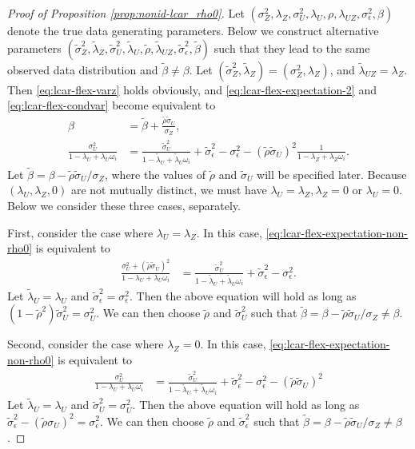 \documentclass[11pt]{article}
\theoremstyle{definition}
\theoremstyle{remark}
\begin{document}
\begin{proof}[Proof of Proposition \ref{prop:nonid-lcar_rho0}]
    Let $(\sigma_Z^2, \lambda_Z, \sigma_U^2, \lambda_U, \rho, \lambda_{UZ}, \sigma_\epsilon^2, \beta)$ denote the true data generating parameters. 
Below we construct alternative parameters $(\tilde\sigma_Z^2, \tilde\lambda_Z, \tilde\sigma_U^2, \tilde\lambda_U, \tilde\rho, \tilde\lambda_{UZ}, \tilde\sigma_\epsilon^2, \tilde\beta)$ such that they lead to the same observed data distribution and $\tilde\beta \ne \beta$. 
Let $(\tilde\sigma_Z^2, \tilde{\lambda}_Z) = (\sigma_Z^2, \lambda_Z)$, and $\tilde\lambda_{UZ} = \lambda_Z$. 
Then \eqref{eq:lcar-flex-varz} holds obviously, 
and \eqref{eq:lcar-flex-expectation-2} and \eqref{eq:lcar-flex-condvar} become equivalent to 
\begin{align}\label{eq:lcar-flex-expectation-non-rho0}
\beta & = \tilde\beta + \frac{\tilde\rho \tilde\sigma_U}{\sigma_Z}, 
\nonumber
\\
\frac{\sigma_U^2}{1-\lambda_U + \lambda_U \omega_i}  
& = \frac{\tilde\sigma_U^2}{1-\tilde\lambda_U + \tilde\lambda_U \omega_i} + \tilde\sigma_\epsilon^2 - \sigma_\epsilon^2
- (\tilde\rho\tilde\sigma_U)^2 \frac{1}{1-\lambda_Z+\lambda_Z \omega_i}.
\end{align}
Let $\tilde\beta = \beta - \tilde\rho \tilde\sigma_U/\sigma_Z$, where the values of $\tilde\rho$ and $\tilde\sigma_U$ will be specified later. 
Because $(\lambda_U, \lambda_Z, 0)$ are not mutually distinct, we must have $\lambda_U = \lambda_Z, \lambda_Z = 0$ or $\lambda_U = 0$. 
Below we consider these three cases, separately. 

First, consider the case where $\lambda_U = \lambda_Z$. In this case, 
\eqref{eq:lcar-flex-expectation-non-rho0} is equivalent to 
\begin{align*}
    \frac{\sigma_U^2 + (\tilde\rho\tilde\sigma_U)^2}{1-\lambda_U + \lambda_U \omega_i}  
& = \frac{\tilde\sigma_U^2}{1-\tilde\lambda_U + \tilde\lambda_U \omega_i} + \tilde\sigma_\epsilon^2 - \sigma_\epsilon^2. 
\end{align*}
Let $\tilde\lambda_U = \lambda_U$ and $\tilde\sigma_\epsilon^2 = \sigma_\epsilon^2$. Then the above equation will hold as long as $(1-\tilde\rho^2) \tilde\sigma_U^2 = \sigma^2_U$. We can then choose $\tilde{\rho}$ and $\tilde\sigma_U^2$ such that $\tilde\beta = \beta - \tilde\rho \tilde\sigma_U/\sigma_Z \ne \beta$. 


Second, consider the case where $\lambda_Z=0$. In this case, 
\eqref{eq:lcar-flex-expectation-non-rho0} is equivalent to 
\begin{align*}
    \frac{\sigma_U^2}{1-\lambda_U + \lambda_U \omega_i}  
& = \frac{\tilde\sigma_U^2}{1-\tilde\lambda_U + \tilde\lambda_U \omega_i} + \tilde\sigma_\epsilon^2 - \sigma_\epsilon^2
- (\tilde\rho\tilde\sigma_U)^2 
\end{align*}
Let $\tilde\lambda_U = \lambda_U$ and $\tilde\sigma_U^2 = \sigma_U^2$. 
Then the above equation will hold as long as $\tilde\sigma_\epsilon^2 
- (\tilde\rho \sigma_U)^2 = \sigma_\epsilon^2$. 
We can then choose $\tilde\rho$ and $\tilde\sigma_\epsilon^2$ such that $\tilde\beta = \beta - \tilde\rho \tilde\sigma_U/\sigma_Z \ne \beta$. 


\end{proof}
\end{document}
